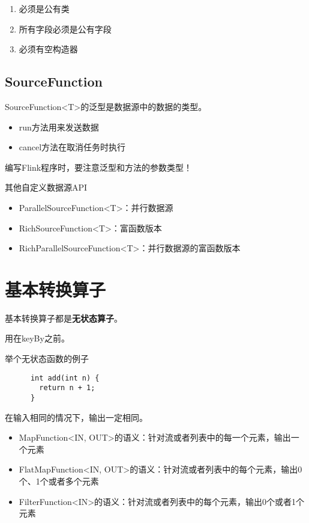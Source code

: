 \documentclass[cn,11pt,chinese]{elegantbook}
\begin{document}
\begin{enumerate}
  \item 必须是公有类
  \item 所有字段必须是公有字段
  \item 必须有空构造器
\end{enumerate}

\subsection{SourceFunction}

SourceFunction<T>的泛型是数据源中的数据的类型。

\begin{itemize}
  \item run方法用来发送数据
  \item cancel方法在取消任务时执行
\end{itemize}

\begin{note}
  编写Flink程序时，要注意泛型和方法的参数类型！
\end{note}

其他自定义数据源API

\begin{itemize}
  \item ParallelSourceFunction<T>：并行数据源
  \item RichSourceFunction<T>：富函数版本
  \item RichParallelSourceFunction<T>：并行数据源的富函数版本
\end{itemize}

\section{基本转换算子}

基本转换算子都是\textbf{无状态算子}。

用在keyBy之前。

举个无状态函数的例子

\begin{lstlisting}
      int add(int n) {
        return n + 1;
      }
\end{lstlisting}

在输入相同的情况下，输出一定相同。

\begin{itemize}
  \item MapFunction<IN, OUT>的语义：针对流或者列表中的每一个元素，输出一个元素
  \item FlatMapFunction<IN, OUT>的语义：针对流或者列表中的每个元素，输出0个、1个或者多个元素
  \item FilterFunction<IN>的语义：针对流或者列表中的每个元素，输出0个或者1个元素
\end{itemize}
\end{document}
